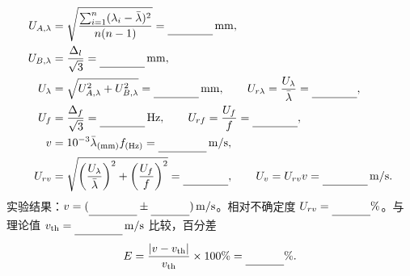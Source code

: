 \documentclass[UTF8,a4paper,10pt,fontset=fandol]{ctexart}
\makeatletter
\newcommand{\Field}[2][1.7cm]{%
  \underline{\makebox[#1][c]{%
    \ifcsname expdata@#2\endcsname\csname expdata@#2\endcsname\else\strut\fi}}}
\newcommand{\MathField}[2][1.7cm]{\mbox{\Field[#1]{#2}}}
\makeatother
\begin{document}
\begin{align*}
U_{A,\lambda}&=\sqrt{\frac{\sum_{i=1}^{n}(\lambda_i-\bar\lambda)^2}{n(n-1)}}
  =\MathField[1.4cm]{res_u_a}\,\mathrm{mm},\\
U_{B,\lambda}&=\frac{\Delta_l}{\sqrt3}=\MathField[1.4cm]{res_u_b}\,\mathrm{mm},\\
U_\lambda&=\sqrt{U_{A,\lambda}^2+U_{B,\lambda}^2}
  =\MathField[1.4cm]{res_u_lambda}\,\mathrm{mm},\qquad
U_{r\lambda}=\frac{U_\lambda}{\bar\lambda}
  =\MathField[1.4cm]{res_u_r_lambda},\\
U_f&=\frac{\Delta_f}{\sqrt3}=\MathField[1.4cm]{res_u_f}\,\mathrm{Hz},\qquad
U_{rf}=\frac{U_f}{f}=\MathField[1.4cm]{res_u_r_f},\\
v&=10^{-3}\bar\lambda_{\mathrm{(mm)}} f_{\mathrm{(Hz)}}=\MathField[1.5cm]{res_speed}\,\mathrm{m/s},\\
U_{rv}&=\sqrt{\left(\frac{U_\lambda}{\bar\lambda}\right)^2+
              \left(\frac{U_f}{f}\right)^2}
  =\MathField[1.4cm]{res_u_r_v},\qquad
U_v=U_{rv}v=\MathField[1.4cm]{res_u_v}\,\mathrm{m/s}.
\end{align*}
实验结果：$v=(\MathField[1.5cm]{res_speed_result}\pm\MathField[1.2cm]{res_u_v_result})\,\mathrm{m/s}$。相对不确定度 $U_{rv}=\MathField[1.2cm]{res_u_r_v_percent}\%$。与理论值 $v_{\mathrm{th}}=\MathField[1.5cm]{res_speed_theory}\,\mathrm{m/s}$ 比较，百分差
\begin{equation*}
E=\frac{|v-v_{\mathrm{th}}|}{v_{\mathrm{th}}}\times100\%
 =\MathField[1.2cm]{res_error_percent}\%.
\end{equation*}
\end{document}
